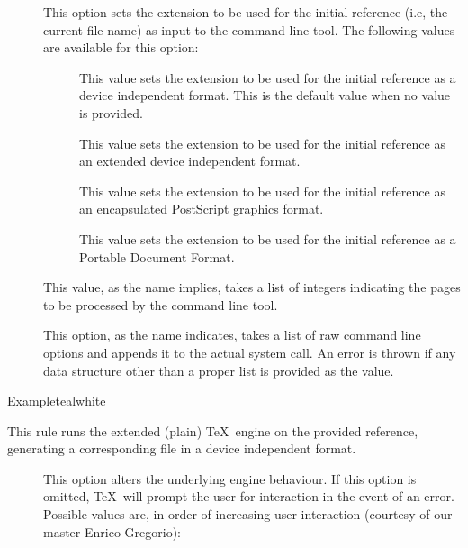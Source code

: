 \begin{description}
\begin{description}
\item[] This option sets the extension to be used for the initial reference (i.e, the current file name) as input to the command line tool. The following values are available for this option:

\begin{description}
\item[] This value sets the extension to be used for the initial reference as a device independent format. This is the default value when no value is provided.

\item[] This value sets the extension to be used for the initial reference as an extended device independent format.

\item[] This value sets the extension to be used for the initial reference as an encapsulated PostScript graphics format.

\item[] This value sets the extension to be used for the initial reference as a Portable Document Format.
\end{description}

\item[] This value, as the name implies, takes a list of integers indicating the pages to be processed by the command line tool.

\item[] This option, as the name indicates, takes a list of raw command line options and appends it to the actual system call. An error is thrown if any data structure other than a proper list is provided as the value.
\end{description}

\begin{codebox}{Example}{teal}{\icnote}{white}
\end{codebox}

\item[\rulebox{etex}]
This rule runs the  extended (plain) \TeX\ engine on the provided  reference, generating a corresponding file in a device independent format.

\begin{description}
\item[] This option alters the underlying engine behaviour. If this option is omitted, \TeX\ will prompt the user for interaction in the event of an error. Possible values are, in order of increasing user interaction (courtesy of our master Enrico Gregorio):


\end{description}
\end{description}
